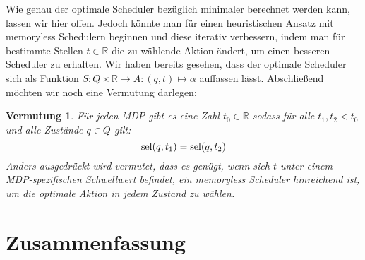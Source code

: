 \documentclass[a4paper]{article}
\newtheorem{vermutung}[satz]{Vermutung}
\theoremstyle{nonumberplain}
\begin{document}
\begin{comment}
Wir haben also das Problem, für einen gegebenen Zustand $q$ und ein gegebenes Ziel $t$ den Scheduler $\mathcal{S}$ zu finden, der $\mvt_{\mathcal{S},q}(\tilde{R},t)$ minimiert, auf das Bestimmen von $g(q,x)$ für Zustände $q$ und diskrete Stellen $x \in \mathbb{R}$ zurückgeführt. Dieses lässt sich auch als Optimierungsproblem auffassen: Wähle die Funktion $g$ so, dass $g(q,t)$ maximal wird und dabei für alle $x\in \mathbb{R}$ gilt:
\begin{align}
	g(q,x) &= x^2 && \text{falls } q\in T\\
	g(q,x) &\leq \sum_{q' \in Q} P(q,\alpha,q') \cdot g\big(q',x -R(q,\alpha,q')\big) && \text{falls }q \notin T, \alpha \in A
\end{align}

Wie dieses Problem gelöst bzw. effizient gelöst werden kann, lassen wir an dieser Stelle offen.
\end{comment}

Wie genau der optimale Scheduler bezüglich minimaler \vt{} berechnet werden kann, lassen wir hier offen.
Jedoch könnte man für einen heuristischen Ansatz mit memoryless Schedulern beginnen und diese iterativ verbessern, indem man für bestimmte Stellen $t\in \mathbb{R}$ die zu wählende Aktion ändert, um einen besseren Scheduler zu erhalten. Wir haben bereits gesehen, dass der optimale Scheduler sich als Funktion $S : Q \times \mathbb{R} \to A : (q,t) \mapsto \alpha$ auffassen lässt.
Abschließend möchten wir noch eine Vermutung darlegen:

\begin{vermutung}
	Für jeden MDP \mdpex{} gibt es eine Zahl $t_0\in \mathbb{R}$ sodass für alle $t_1,t_2 < t_0$ und alle Zustände $q\in Q$ gilt:
	\begin{equation}
		\mathrm{sel}(q,t_1) = \mathrm{sel}(q,t_2)
	\end{equation}
	Anders ausgedrückt wird vermutet, dass es genügt, wenn sich $t$ unter einem MDP-spezifischen Schwellwert befindet, ein memoryless Scheduler hinreichend ist, um die optimale Aktion in jedem Zustand zu wählen. 
\end{vermutung}

\section{Zusammenfassung}
\end{document}
